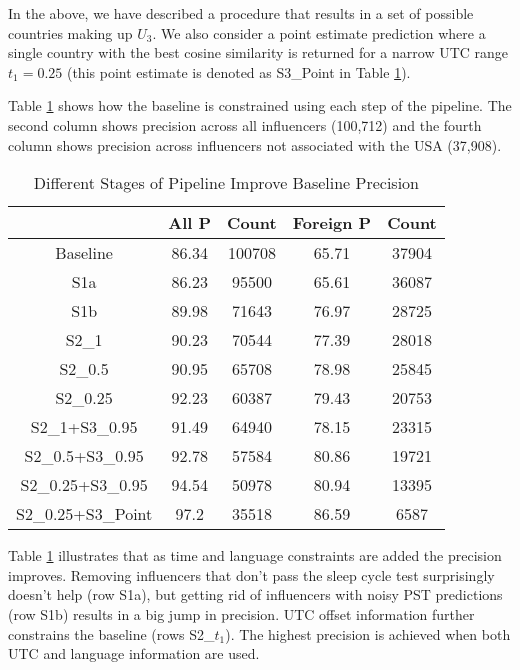 In the above, we have described a procedure that results in a set of possible countries making up $U_3$. We also consider a point estimate prediction where a single country with the best cosine similarity is returned for a narrow UTC range $t_1=0.25$ (this point estimate is denoted as S3\_Point in Table \ref{table_5app}).

Table \ref{table_5app} shows how the baseline is constrained using each step of the pipeline. The second column shows precision across all influencers (100,712) and the fourth column shows precision across influencers not associated with the USA (37,908).

\begin{table}[htbp]
\small
\caption{Different Stages of Pipeline Improve Baseline Precision}
\label{table_5app}
\centering
\begin{tabular}{|c|c|c|c|c|}
\hline
& \bfseries All P & \bfseries Count & \bfseries Foreign P & \bfseries Count\\
\hline
Baseline & 86.34 & 100708 & 65.71 & 37904 \\
\hline
S1a & 86.23 & 95500 & 65.61 & 36087 \\
\hline
S1b & 89.98 & 71643 & 76.97 & 28725 \\
\hline
S2\_1 & 90.23 & 70544 & 77.39 & 28018 \\
\hline
S2\_0.5 & 90.95 & 65708 & 78.98 & 25845 \\
\hline
S2\_0.25 & 92.23 & 60387 & 79.43 & 20753 \\
\hline
S2\_1+S3\_0.95 & 91.49 & 64940 & 78.15 & 23315 \\
\hline
S2\_0.5+S3\_0.95 & 92.78 & 57584 & 80.86 & 19721 \\
\hline
S2\_0.25+S3\_0.95 & 94.54 & 50978 & 80.94 & 13395 \\
\hline
S2\_0.25+S3\_Point & 97.2 & 35518 & 86.59 & 6587 \\
\hline
\end{tabular}
\end{table}

Table \ref{table_5app} illustrates that as time and language constraints are added the precision improves. Removing influencers that don't pass the sleep cycle test surprisingly doesn't help (row S1a), but getting rid of influencers with noisy PST predictions (row S1b) results in a big jump in precision.%
UTC offset information further constrains the baseline (rows S2\_$t_1$). 
The highest precision is achieved when both UTC and language information are used. 

